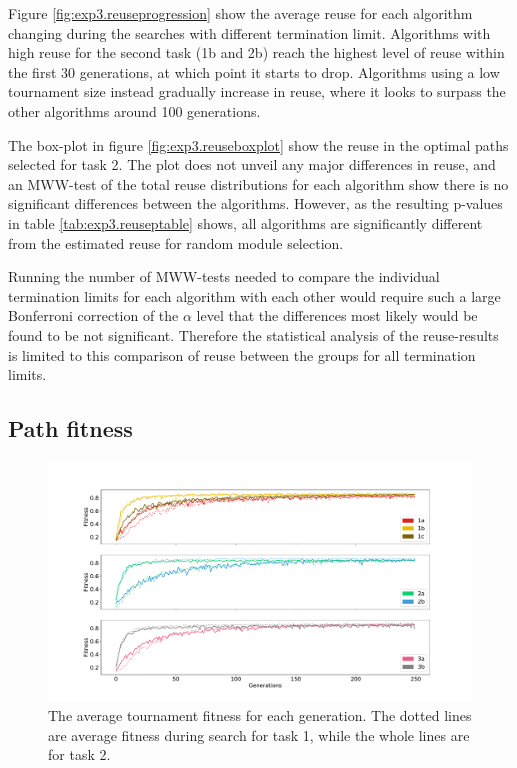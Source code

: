 Figure \ref{fig:exp3.reuseprogression} show the average reuse for each algorithm changing during the searches with different termination limit. Algorithms with high reuse for the second task (1b and 2b) reach the highest level of reuse within the first 30 generations, at which point it starts to drop. Algorithms using a low tournament size instead gradually increase in reuse, where it looks to surpass the other algorithms around 100 generations.  

The box-plot in figure \ref{fig:exp3.reuseboxplot} show the reuse in the optimal paths selected for task 2. The plot does not unveil any major differences in reuse, and an MWW-test of the total reuse distributions for each algorithm show there is no significant differences between the algorithms. However, as the resulting p-values in table \ref{tab:exp3.reuseptable} shows, all algorithms are significantly different from the estimated reuse for random module selection. 

Running the number of MWW-tests needed to compare the individual termination limits for each algorithm with each other would require such a large Bonferroni correction of the \(\alpha\) level that the differences most likely would be found to be not significant. Therefore the statistical analysis of the reuse-results is limited to this comparison of reuse between the groups for all termination limits.

\subsection{Path fitness}
\begin{figure}
    \includegraphics[width=1.25\textwidth, center]{Chapters/4.Experiments/exp3/figures/fitness_progression.pdf}
    \caption[Changes in average tournament fitness]{The average tournament fitness for each generation. The dotted lines are average fitness during search for task 1, while the whole lines are for task 2.}
    \label{fig:exp3.fitness}
\end{figure}

